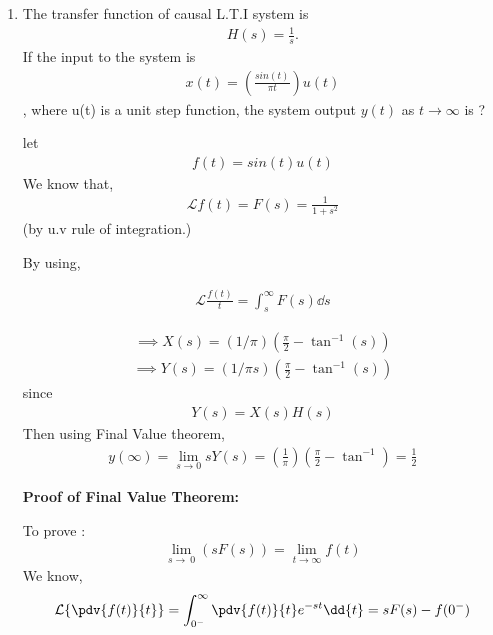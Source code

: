 \begin{enumerate}[label=\thesection.\arabic*.,ref=\thesection.\theenumi]
\item The transfer function of causal L.T.I system is 
\begin{align}
H(s) = \frac{1}{s}. 
\end{align}If the input to the system is 
\begin{align}
x(t) = (\frac{sin(t)}{\pi t})u(t)
\end{align}
, where u(t) is a unit step function, the system output 
$y(t)$ as $t \to \infty$  is ?

\solution
let
\begin{align}
    f(t) = sin(t)u(t)
\end{align}
We know that, 
\begin{align}
\mathcal{L}{f(t)} = F(s) = \frac{1}{1 + s^2} 
\end{align}
    (by u.v rule of integration.)

By using,  

\begin{align}
  \mathcal{L}{\frac{f(t)}{t}} = \int_{s}^{\infty}F(s) \dd{s} 
\end{align}

\begin{align}
\implies X(s) = (1/ \pi)( \frac{\pi}{2} - \tan^{-1}(s))
\end{align}
\begin{align}
\implies Y(s) = (1/ \pi s) ( \frac{\pi}{2} - \tan^{-1}(s)) 
\end{align}
since 
\begin{align}
Y(s) = X(s)H(s)
\end{align}
Then using Final Value theorem,
\begin{align}
y(\infty) = \lim_{s\to 0} sY(s) =(\frac{1}{\pi}) ( \frac{\pi}{2} - \tan^{-1}) = \frac{1}{2}
\end{align}





\textbf{ Proof of Final Value Theorem:}

To prove : 
\begin{align}
 \lim_{s\to\ 0} (sF(s)) = \lim_{t\to\infty} f(t)
\end{align}
We know,
\begin{align}
\mathcal{L}\{\pdv{f(t)}{t}\} = \int_{0^-}^{\infty} \pdv{f(t)}{t} e^{-st}\dd{t} =sF(s)-f(0^{-})
\end{align}


\end{enumerate}
